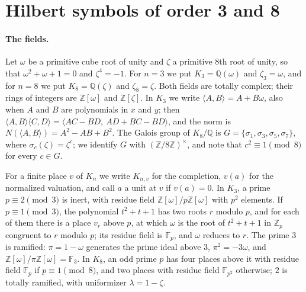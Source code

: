 \documentclass[11pt]{article}
\newcommand{\Z}{\mathbb{Z}}
\newcommand{\Q}{\mathbb{Q}}
\newcommand{\F}{\mathbb{F}}
\begin{document}
\section{Hilbert symbols of order 3 and 8}\label{sec:symbols}

\paragraph{The fields.} Let $\omega$ be a primitive cube root of unity and $\zeta$ a primitive $8$th root of unity, so that $\omega^2+\omega+1=0$ and $\zeta^4=-1$. For $n=3$ we put $K_3=\Q(\omega)$ and $\zeta_3=\omega$, and for $n=8$ we put $K_8=\Q(\zeta)$ and $\zeta_8=\zeta$. Both fields are totally complex; their rings of integers are $\Z[\omega]$ and $\Z[\zeta]$. In $K_3$ we write $\langle A,B\rangle=A+B\omega$, also when $A$ and $B$ are polynomials in $x$ and $y$; then $\langle A,B\rangle\langle C,D\rangle=\langle AC-BD,\ AD+BC-BD\rangle$, and the norm is $N(\langle A,B\rangle)=A^2-AB+B^2$. The Galois group of $K_8/\Q$ is $G=\{\sigma_1,\sigma_3,\sigma_5,\sigma_7\}$, where $\sigma_c(\zeta)=\zeta^c$; we identify $G$ with $(\Z/8\Z)^\times$, and note that $c^2\equiv1\pmod8$ for every $c\in G$.

For a finite place $v$ of $K_n$ we write $K_{n,v}$ for the completion, $v(a)$ for the normalized valuation, and call $a$ a unit at $v$ if $v(a)=0$. In $K_3$, a prime $p\equiv2\pmod3$ is inert, with residue field $\Z[\omega]/p\Z[\omega]$ with $p^2$ elements. If $p\equiv1\pmod3$, the polynomial $t^2+t+1$ has two roots $r$ modulo $p$, and for each of them there is a place $v_r$ above $p$, at which $\omega$ is the root of $t^2+t+1$ in $\Z_p$ congruent to $r$ modulo $p$; its residue field is $\F_p$, and $\omega$ reduces to $r$. The prime $3$ is ramified: $\pi=1-\omega$ generates the prime ideal above $3$, $\pi^2=-3\omega$, and $\Z[\omega]/\pi\Z[\omega]=\F_3$. In $K_8$, an odd prime $p$ has four places above it with residue field $\F_p$ if $p\equiv1\pmod8$, and two places with residue field $\F_{p^2}$ otherwise; $2$ is totally ramified, with uniformizer $\lambda=1-\zeta$.
\end{document}
